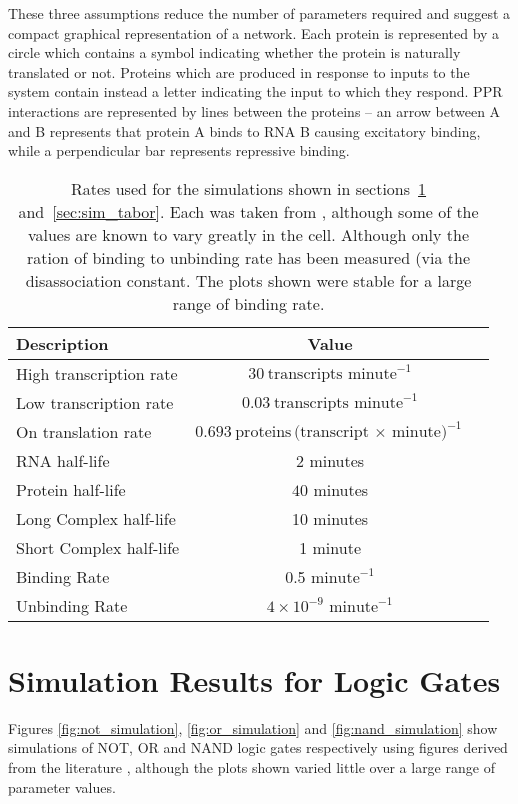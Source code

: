 These three assumptions reduce the number of parameters required and suggest a
compact graphical representation of a network.
Each protein is represented by a circle which contains a symbol indicating
whether the protein is naturally translated or not.
Proteins which are produced in response to inputs to the system contain instead 
a letter indicating the input to which they respond.
PPR interactions are represented by lines between the proteins -- an arrow
between A and B represents that protein A binds to RNA B causing excitatory
binding, while a perpendicular bar represents repressive binding.

\begin{table}
  \centering
  \begin{tabular}{l | c | c }
    Description  & Value \\ \hline
    High transcription rate & $30~\text{transcripts minute}^{-1}$ \\
    Low transcription rate & $0.03~\text{transcripts minute}^{-1}$ \\
    On translation rate & $0.693~\mathrm{proteins}
      \text{(transcript $\times$ minute)}^{-1}$ \\
    RNA half-life & $2$ minutes \\
    Protein half-life & $40$ minutes \\
    Long Complex half-life & 10 minutes \\
    Short Complex half-life & 1 minute \\
    Binding Rate & 0.5 $\text{minute}^{-1}$ \\
    Unbinding Rate & $4\times 10^{-9}$ $\text{minute}^{-1}$ \\
  \end{tabular}
  \caption{Rates used for the simulations shown in sections~\ref{sec:sim_logic}
  and~\ref{sec:sim_tabor}. Each was taken from  
  \citet{So2011,Andersen1998}, although some of the values are known to vary
  greatly in the cell.
  Although only the ration of binding to unbinding rate has been measured (via
  the disassociation constant. The plots shown were stable for a large range of
  binding rate.}
  \label{tab:sim_values}
\end{table}

\section{Simulation Results for Logic Gates}
\label{sec:sim_logic}

Figures \ref{fig:not_simulation}, \ref{fig:or_simulation} and
\ref{fig:nand_simulation} show simulations of NOT, OR and NAND logic gates
respectively using figures derived from the literature  
\citep[see][]{So2011,Andersen1998}, 
although the plots shown varied little over a large range of parameter values.

